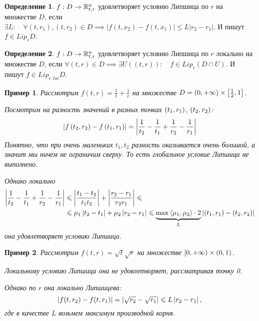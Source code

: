 \documentclass[a5paper, 10pt]{article}
\theoremstyle{definition}
\newtheorem{Def}{Определение}
\theoremstyle{plain}
\newtheorem{Ex}{Пример}
\theoremstyle{remark}
\begin{document}
	\begin{Def}
		$f: D \rightarrow \mathbb{R}^n_{t,r}$ удовлетворяет условию Липшица по $r$ на множестве $D$, если $\exists L: \quad \forall (t, r_1), (t,r_2) \in D \implies |f(t, x_2) - f(t,x_1)| \leqslant L |r_2-r_1|$. И пишут $f\in Lip_r D$.
	\end{Def}

	\begin{Def}
		$f: D \rightarrow \mathbb{R}^n_{t,r}$ удовлетворяет условию Липшица по $r$ локально на множестве $D$, если $\forall (t,r) \in D \implies \exists U((t,r)): \quad f \in Lip_r(D\cap U)$. И пишут $f\in Lip_{r,loc} D$.
	\end{Def}

	\begin{Ex}
		Рассмотрим $f(t,r) = \frac1t + \frac1r$ на множестве $D = \left(0, +\infty\right) \times \left[\frac12, 1\right]$.
		
		Посмотрим на разность значений в разных точках $\left(t_1, r_1\right)$, $\left(t_2, r_2\right)$:
		\[
		\left|f\left(t_2, r_2\right)-f\left(t_1, r_1\right)\right| = \left|\frac1{t_2} - \frac1{t_1} + \frac1{r_2} - \frac1{r_1}\right|
		\]
		Понятно, что при очень маленьких $t_1, t_2$ разность оказывается очень большой, а  значит мы ничем не ограничим сверху. То есть глобальное условие Липшица не выполнено.
		
		Однако локально
		\[
		\begin{split}
		\left|\frac1{t_2} - \frac1{t_1} + \frac1{r_2} - \frac1{r_1}\right| &\leqslant \left|\frac{t_1-t_2}{t_1t_2}\right| + \left|\frac{r_2-r_1}{r_2r_1}\right| \leqslant\\&\leqslant \mu_1 \left|t_2-t_1\right| + \mu_2 \left|r_2-r_1\right| \leqslant \underbrace{\max\left\langle\mu_1, \mu_2\right\rangle \cdot 2}_{L} \left|(t_1,r_1)- (t_2,r_2)\right|
		\end{split}
		\]
		она удовлетворяет условию Липшица.
	\end{Ex}

	\begin{Ex}
		Рассмотрим $f(t,r) = \sqrt{t} \sqrt{r}$ на множестве $\left[0, +\infty\right) \times \left(0,1\right)$.
		
		Локальному условию Липшица она не удовлетворяет, рассматривая точку 0.
		
		Однако по $r$ она локально Липшицева:
		\[
		\left|f(t,r_2) - f(t,r_1)\right| = \left|\sqrt{r_2} - \sqrt{r_1}\right| \leqslant L \left|r_2-r_1\right|,
		\]
		где в качестве $L$ возьмем максимум производной корня. 
	\end{Ex}
\end{document}
